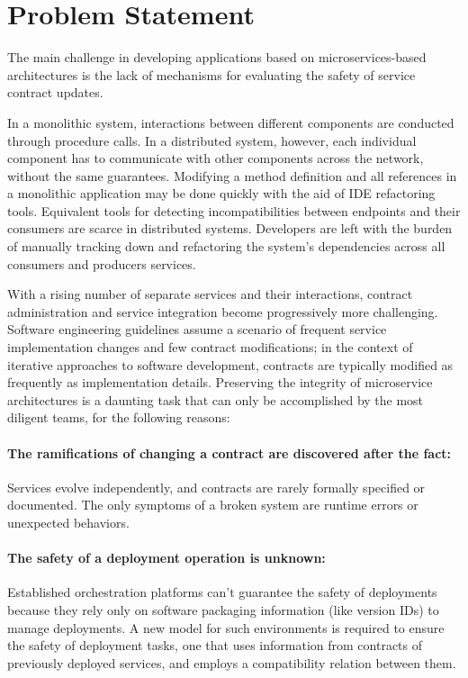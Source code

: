 \section{Problem Statement} %
\label{sec:problem_statement}

The main challenge in developing applications based on microservices-based architectures is the lack of mechanisms for evaluating the safety of service contract updates.

In a monolithic system, interactions between different components are conducted through procedure calls.
In a distributed system, however, each individual component has to communicate with other components across the network,
without the same guarantees.
Modifying a method definition and all references in a monolithic application may be done quickly with the aid of IDE refactoring tools.
Equivalent tools for detecting incompatibilities between endpoints and their consumers are scarce in distributed systems.
Developers are left with the burden of manually tracking down and refactoring the system's dependencies across all consumers and producers services.

With a rising number of separate services and their interactions, contract administration and service integration become progressively more challenging.
Software engineering guidelines assume a scenario of frequent service implementation changes and few contract modifications;
in the context of iterative approaches to software development, contracts are typically modified as frequently as implementation details.
Preserving the integrity of microservice architectures is a daunting task that can only be accomplished by the most diligent teams, for the following reasons:

\paragraph{ The ramifications of changing a contract are discovered after the fact:}
Services evolve independently, and contracts are rarely formally specified or documented.
The only symptoms of a broken system are runtime errors or unexpected behaviors.

\paragraph{ The safety of a deployment operation is unknown:}
Established orchestration platforms can't guarantee the safety of deployments because they rely only on software packaging information (like version IDs) to manage deployments.
A new model for such environments is required to ensure the safety of deployment tasks, one that uses information from contracts of previously deployed services,
 and employs a compatibility relation between them.

